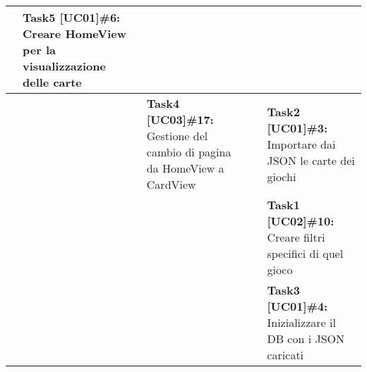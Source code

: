 \documentclass{article}
\begin{document}
\begin{itemize}
\begin{itemize}
\begin{tabular}{ | p{2.4cm} | p{1.4cm} | p{2.7cm} | p{3.4cm} | p{3cm} | }
                & \textbf{Task5 [UC01]\#6:} Creare HomeView per la visualizzazione delle carte \\
                \hline
                & & \textbf{Task4 [UC03]\#17:} Gestione del cambio di pagina da HomeView a CardView
                & & \textbf{Task2 [UC01]\#3:} Importare dai JSON le carte dei giochi \\
                \hline
                & & & & \textbf{Task1 [UC02]\#10:} Creare filtri specifici di quel gioco  \\
                \hline
                & & & & \textbf{Task3 [UC01]\#4:} Inizializzare il DB con i JSON caricati \\
                \hline
            \end{tabular}
        \end{itemize}




\end{itemize}
\end{document}
